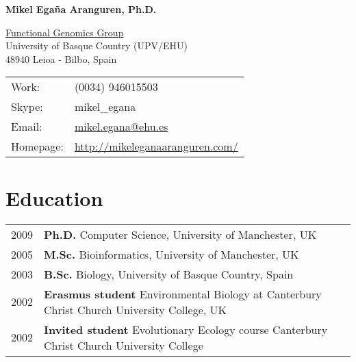 \documentclass[11pt,fullpage]{article}
\newcommand{\etc}{\emph{etc.}}
\def\name{Mikel Ega\~na Aranguren, Ph.D.}
\begin{document}


\centerline{\Large \bf \name}

\vspace{0.25in}

\begin{minipage}{0.50\linewidth}
  \href{http://www.genomic-resources.eu/}{Functional Genomics Group} \\
  University of Basque Country (UPV/EHU) \\
  48940 Leioa - Bilbo, Spain \\

\end{minipage}
\begin{minipage}{0.50\linewidth}
  \begin{tabular}{ll}
    Work: & (0034) 946015503 \\
    Skype: & mikel\_egana \\
    Email: & \href{mailto:mikel.egana@ehu.es}{mikel.egana@ehu.es} \\
    Homepage: & \href{http://mikeleganaaranguren.com/}{http://mikeleganaaranguren.com/} 
    
  \end{tabular}
\end{minipage}

\section*{Education}

\begin{tabular}{ll} 
	2009 & {\bf Ph.D.} Computer Science, University of Manchester, UK \\
	2005 & {\bf M.Sc.} Bioinformatics, University of Manchester, UK \\
	2003 & {\bf B.Sc.} Biology, University of Basque Country, Spain \\
	2002 & {\bf Erasmus student} Environmental Biology at Canterbury Christ Church University College, UK \\
	2002 & {\bf Invited student} Evolutionary Ecology course Canterbury Christ Church University College \\
	
\end{tabular}
\end{document}
